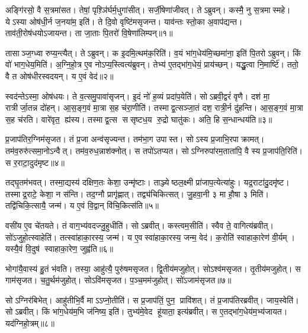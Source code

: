 \setcounter{anuvakam}{0}

अङ्गि॑रसो॒ वै स॒त्रमा॑सत।
तेषां॒ पृश़्ञि॑र्घर्म॒धुगा॑सीत्।
सर्जी॒षेणा॑जीवत्।
तेऽब्रुवन्।
कस्मै॒ नु स॒त्रमास्महे।
येऽस्या ओष॑धी॒र्न ज॒नया॑म॒ इति॑।
ते दि॒वो वृष्टि॑मसृजन्त।
याव॑न्तः स्तो॒का अ॒वाप॑द्यन्त।
ताव॑ती॒रोष॑धयोऽजायन्त।
ता जा॒ताः पि॒तरो॑ वि॒षेणा॑लिम्पन्॥१॥

तासाञ्ज॒ग्ध्वा रुप्य॒न्त्यैत्।
तेऽब्रुवन्।
क इ॒दमि॒त्थम॑क॒रिति॑।
व॒यं भा॑ग॒धेय॑मि॒च्छमा॑ना॒ इति॑ पि॒तरोऽब्रुवन्।
किं वो॑ भाग॒धेय॒मिति॑।
अ॒ग्नि॒हो॒त्र ए॒व नोऽप्य॒स्त्वित्य॑ब्रुवन्।
तेभ्य॑ ए॒तद्भा॑ग॒धेयं॒ प्राय॑च्छन्।
यद्धु॒त्वा नि॒मार्ष्टि॑।
ततो॒ वै त ओष॑धीरस्वदयन्।
य ए॒वं वेद॑॥२॥

स्वद॑न्तेऽस्मा॒ ओष॑धयः।
ते व॒त्समु॒पावा॑सृजन्।
इ॒दं नो॑ ह॒व्यं प्रदा॑प॒येति॑।
सोऽब्रवी॒द्वरं॑ वृणै।
दश॑ मा॒ रात्रीर्जा॒तन्न दो॑हन्।
आ॒स॒ङ्ग॒वं मा॒त्रा स॒ह च॑रा॒णीति॑।
तस्माद्व॒त्सञ्जा॒तं दश॒ रात्री॒र्न दु॑हन्ति।
आ॒स॒ङ्ग॒वं मा॒त्रा स॒ह च॑रति।
वारे॑वृत॒ ह्य॑स्य।
तस्माद्व॒त्स ससृष्टध॒य रु॒द्रो घातु॑कः।
अति॒ हि स॒न्धान्धय॑ति॥३॥\anuvakamend[अ॒लि॒म्प॒न्वेद॒ घातु॑क॒ एकं च]

प्र॒जाप॑तिर॒ग्निम॑सृजत।
तं प्र॒जा अन्व॑सृज्यन्त।
तम॑भा॒ग उपास्त।
सोऽस्य प्र॒जाभि॒रपाक्रामत्।
तम॑व॒रुरु॑त्समा॒नोऽन्वैत्।
तम॑व॒रुध॒न्नाश॑क्नोत्।
स तपो॑ऽतप्यत।
सोऽग्निरुपा॑रम॒ताता॑पि॒ वै स्य प्र॒जाप॑ति॒रिति॑।
स र॒राटा॒दुद॑मृष्ट॥४॥

तद्घृ॒तम॑भवत्।
तस्मा॒द्यस्य॑ दक्षिण॒तः केशा॒ उन्मृ॑ष्टाः।
ताञ्ज्येष्ठल॒क्ष्मी प्रा॑जाप॒त्येत्या॑हुः।
यद्र॒राटा॑दु॒दमृ॑ष्ट।
तस्माद्र॒राटे॒ केशा॒ न स॑न्ति।
तद॒ग्नौ प्रागृ॑ह्णात्।
तद्व्य॑चिकित्सत्।
जु॒हवा॒नी ३ मा हौ॒षा ३ मिति॑।
तद्वि॑चिकि॒त्सायै॒ जन्म॑।
य ए॒वं वि॒द्वान् वि॑चि॒कित्स॑ति॥५॥

वसी॑य ए॒व चे॑तयते।
तं वाग॒भ्य॑वदज्जु॒हुधीति॑।
सोऽब्रवीत्।
कस्त्वम॒सीति॑।
स्वैव ते॒ वागित्य॑ब्रवीत्।
सो॑ऽजुहो॒त्स्वाहेति॑।
तत्स्वा॑हाका॒रस्य॒ जन्म॑।
य ए॒वस्वा॑हाका॒रस्य॒ जन्म॒ वेद॑।
क॒रोति॑ स्वाहाका॒रेण॑ वी॒र्यम्।
यस्यै॒वं वि॒दुष॑ स्वाहाका॒रेण॒ जुह्व॑ति॥६॥

भोगा॑यै॒वास्य॑ हु॒तं भ॑वति।
तस्या॒ आहु॑त्यै॒ पुरु॑षमसृजत।
द्वि॒तीय॑मजुहोत्।
सोऽश्व॑मसृजत।
तृ॒तीय॑मजुहोत्।
स गाम॑सृजत।
च॒तु॒र्थम॑जुहोत्।
सोऽवि॑मसृजत।
प॒ञ्च॒मम॑जुहोत्।
सो॑ऽजाम॑सृजत॥७॥

सोऽग्निर॑बिभेत्।
आहु॑तीभि॒र्वै माऽऽप्नो॒तीति॑।
स प्र॒जाप॑तिं॒ पुन॒ प्रावि॑शत्।
तं प्र॒जाप॑तिरब्रवीत्।
जाय॒स्वेति॑।
सोऽब्रवीत्।
किं भा॑ग॒धेय॑म॒भि ज॑निष्य॒ इति॑।
तुभ्य॑मे॒वेद हू॑याता॒ इत्य॑ब्रवीत्।
स ए॒तद्भा॑ग॒धेय॑म॒भ्य॑जायत।
यद॑ग्निहो॒त्रम्॥८॥

